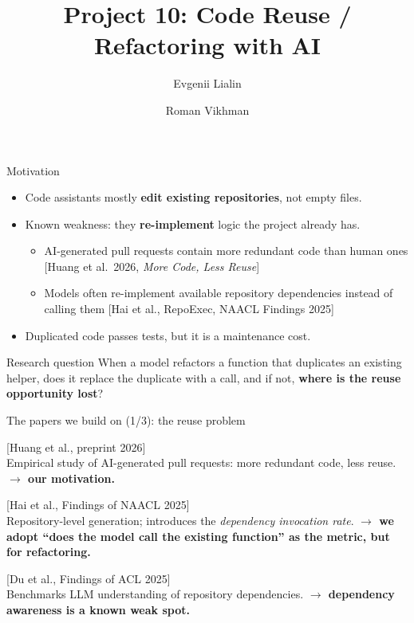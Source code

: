 \documentclass[aspectratio=169,11pt]{beamer}
\title{Project 10: Code Reuse / Refactoring with AI}
\author{Evgenii Lialin \and Roman Vikhman}
\date{}
\newcommand{\venue}[1]{{\scriptsize\color{gray}[#1]}}
\begin{document}
\begin{frame}
  \titlepage
\end{frame}

\begin{frame}{Motivation}
  \begin{itemize}
    \item Code assistants mostly \textbf{edit existing repositories}, not empty files.
    \item Known weakness: they \textbf{re-implement} logic the project already has.
    \begin{itemize}
      \item AI-generated pull requests contain more redundant code than human ones
            \venue{Huang et al.\ 2026, \emph{More Code, Less Reuse}}
      \item Models often re-implement available repository dependencies instead of calling them
            \venue{Hai et al., RepoExec, NAACL Findings 2025}
    \end{itemize}
    \item Duplicated code passes tests, but it is a maintenance cost.
  \end{itemize}
  \vspace{1em}
  \begin{block}{Research question}
    When a model refactors a function that duplicates an existing helper, does it replace the
    duplicate with a call, and if not, \textbf{where is the reuse opportunity lost}?
  \end{block}
\end{frame}

\begin{frame}{The papers we build on (1/3): the reuse problem}
  \begin{description}[RepoExec]
    \item[More Code, Less Reuse] \venue{Huang et al., preprint 2026}\\
      Empirical study of AI-generated pull requests: more redundant code, less reuse.
      \textbf{$\to$ our motivation.}
    \item[RepoExec] \venue{Hai et al., Findings of NAACL 2025}\\
      Repository-level generation; introduces the \emph{dependency invocation rate}.
      \textbf{$\to$ we adopt ``does the model call the existing function'' as the metric,
      but for refactoring.}
    \item[DependEval] \venue{Du et al., Findings of ACL 2025}\\
      Benchmarks LLM understanding of repository dependencies.
      \textbf{$\to$ dependency awareness is a known weak spot.}
  \end{description}
\end{frame}
\end{document}
